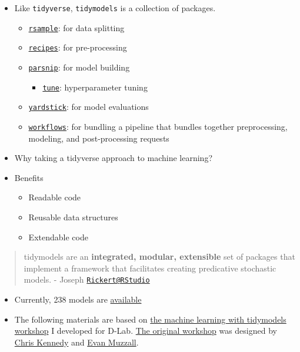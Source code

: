 \documentclass[
]{book}
\providecommand{\tightlist}{%
  \setlength{\itemsep}{0pt}\setlength{\parskip}{0pt}}
\begin{document}
\begin{itemize}
\item
  Like \texttt{tidyverse}, \texttt{tidymodels} is a collection of packages.

  \begin{itemize}
  \item
    \href{https://rsample.tidymodels.org/}{\texttt{rsample}}: for data splitting
  \item
    \href{https://recipes.tidymodels.org/index.html}{\texttt{recipes}}: for pre-processing
  \item
    \href{https://www.tidyverse.org/blog/2018/11/parsnip-0-0-1/}{\texttt{parsnip}}: for model building

    \begin{itemize}
    \tightlist
    \item
      \href{https://github.com/tidymodels/tune}{\texttt{tune}}: hyperparameter tuning
    \end{itemize}
  \item
    \href{https://github.com/tidymodels/yardstick}{\texttt{yardstick}}: for model evaluations
  \item
    \href{https://github.com/tidymodels/workflows}{\texttt{workflows}}: for bundling a pipeline that bundles together preprocessing, modeling, and post-processing requests
  \end{itemize}
\item
  Why taking a tidyverse approach to machine learning?
\item
  Benefits

  \begin{itemize}
  \item
    Readable code
  \item
    Reusable data structures
  \item
    Extendable code
  \end{itemize}
\end{itemize}

\begin{quote}
tidymodels are an \textbf{integrated, modular, extensible} set of packages that implement a framework that facilitates creating predicative stochastic models. - Joseph \href{mailto:Rickert@RStudio}{\nolinkurl{Rickert@RStudio}}
\end{quote}

\begin{itemize}
\item
  Currently, 238 models are \href{https://topepo.github.io/caret/available-models.html}{available}
\item
  The following materials are based on \href{https://github.com/dlab-berkeley/Machine-Learning-with-tidymodels}{the machine learning with tidymodels workshop} I developed for D-Lab. \href{https://github.com/dlab-berkeley/Machine-Learning-in-R}{The original workshop} was designed by \href{https://ck37.com/}{Chris Kennedy} and \href{https://dlab.berkeley.edu/people/evan-muzzall}{Evan Muzzall}.
\end{itemize}
\end{document}
